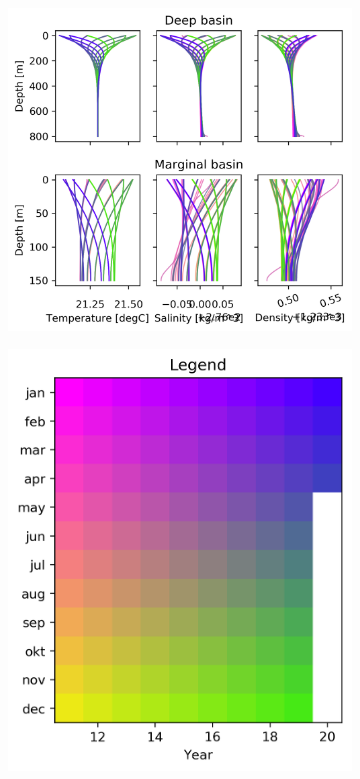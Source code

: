 \documentclass[twocolumn]{article}
\begin{document}
\begin{figure}
\begin{subfigure}[h]{0.7\textwidth}
\centering
\includegraphics[width=\textwidth,keepaspectratio]{high_bg_diff_kleine_uitslag.png}
\end{subfigure}\hfill
\begin{subfigure}[h]{0.20\textwidth}
\centering
\includegraphics[width=1.0\textwidth,keepaspectratio]{high_bg_diff_kleine_uitslag_Legend.png}

\end{subfigure}
\end{figure}
\end{document}
